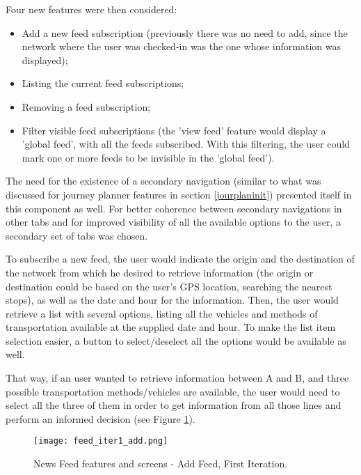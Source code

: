 Four new features were then considered: 

\begin{itemize}
\item Add a new feed subscription (previously there was no need to add, since the network where the user was checked-in was the one whose information was displayed);
\item Listing the current feed subscriptions;
\item Removing a feed subscription;
\item Filter visible feed subscriptions (the 'view feed' feature would display a 'global feed', with all the feeds subscribed. With this filtering, the user could mark one or more feeds to be invisible in the 'global feed').
\end{itemize}

The need for the existence of a secondary navigation (similar to what was discussed for journey planner features in section \ref{jourplaninit}) presented itself in this component as well. For better coherence between secondary navigations in other tabs and for improved visibility of all the available options to the user, a secondary set of tabs was chosen.

To subscribe a new feed, the user would indicate the origin and the destination of the network from which he desired to retrieve information (the origin or destination could be based on the user's GPS location, searching the nearest stops), as well as the date and hour for the information. 
Then, the user would retrieve a list with several options, listing all the vehicles and methods of transportation available at the supplied date and hour. To make the list item selection easier, a button to select/deselect all the options would be available as well.

That way, if an user wanted to retrieve information between A and B, and three possible transportation methods/vehicles are available, the user would need to select all the three of them in order to get information from all those lines and perform an informed decision (see Figure \ref{fig:feed_iter1_add}).

\begin{figure}[htb]
  \begin{center}
    \leavevmode
    \texttt{[image: feed\_iter1\_add.png]}
    \caption{News Feed features and screens - Add Feed, First Iteration.}
    \label{fig:feed_iter1_add}
  \end{center}
\end{figure}


